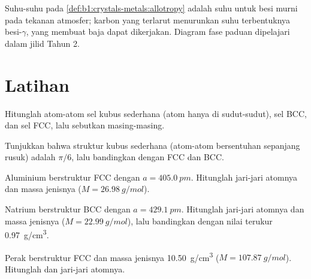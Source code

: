 \begin{remark}\label{rem:b1:crystals-metals:iron-T}
Suhu-suhu pada \cref{def:b1:crystals-metals:allotropy} adalah suhu untuk
besi murni pada tekanan atmosfer; karbon yang terlarut menurunkan suhu
terbentuknya besi-$\gamma$, yang membuat baja dapat dikerjakan. Diagram
fase paduan dipelajari dalam jilid Tahun 2.
\end{remark}

\section{Latihan}

\begin{exercise}[$\star$]\label{exo:b1:crystals-metals:1}
Hitunglah atom-atom sel kubus sederhana (atom hanya di sudut-sudut), sel
BCC, dan sel FCC, lalu sebutkan  masing-masing.
\end{exercise}

\begin{exercise}[$\star$]\label{exo:b1:crystals-metals:2}
Tunjukkan bahwa  struktur kubus sederhana (atom-atom bersentuhan
sepanjang rusuk) adalah $\pi/6$, lalu bandingkan dengan FCC dan BCC.
\end{exercise}

\begin{exercise}[$\star$]\label{exo:b1:crystals-metals:3}
Aluminium berstruktur FCC dengan $a = \qty{405.0}{pm}$. Hitunglah
jari-jari atomnya dan massa jenisnya ($M = \qty{26.98}{g/mol}$).
\end{exercise}

\begin{exercise}[$\star$]\label{exo:b1:crystals-metals:4}
Natrium berstruktur BCC dengan $a = \qty{429.1}{pm}$. Hitunglah jari-jari
atomnya dan massa jenisnya ($M = \qty{22.99}{g/mol}$), lalu bandingkan
dengan nilai terukur \qty{0.97}{g/cm^3}.
\end{exercise}

\begin{exercise}[$\star\star$]\label{exo:b1:crystals-metals:5}
Perak berstruktur FCC dan massa jenisnya \qty{10.50}{g/cm^3}
($M = \qty{107.87}{g/mol}$). Hitunglah  dan jari-jari
atomnya.
\end{exercise}

